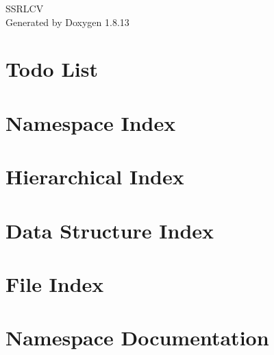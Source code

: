 \documentclass[twoside]{book}
\newcommand{\+}{\discretionary{\mbox{\scriptsize$\hookleftarrow$}}{}{}}
\newcommand{\clearemptydoublepage}{%
  \newpage{\pagestyle{empty}\cleardoublepage}%
}
\begin{document}
\hypersetup{pageanchor=false,
             bookmarksnumbered=true,
             pdfencoding=unicode
            }
\begin{titlepage}
\vspace*{7cm}
\begin{center}%
{\Large S\+S\+R\+L\+CV }\\
\vspace*{1cm}
{\large Generated by Doxygen 1.8.13}\\
\end{center}
\end{titlepage}
\clearemptydoublepage
{}
\tableofcontents
\clearemptydoublepage
{}
\hypersetup{pageanchor=true}

\chapter{Todo List}
\label{todo}

\chapter{Namespace Index}

\chapter{Hierarchical Index}

\chapter{Data Structure Index}

\chapter{File Index}

\chapter{Namespace Documentation}













\end{document}
